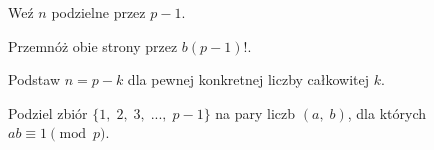 
\begin{hints_list}
	\item Weź $n$ podzielne przez $p - 1$.
	\item Przemnóż obie strony przez $b(p - 1)!$.
	\item Podstaw $n = p - k$ dla pewnej konkretnej liczby całkowitej $k$.
	\item Podziel zbiór $\{1,\; 2,\; 3,\; ...,\; p-1\}$ na pary liczb $(a,\; b)$, dla których $ab \equiv 1 \pmod{p}$.
\end{hints_list}